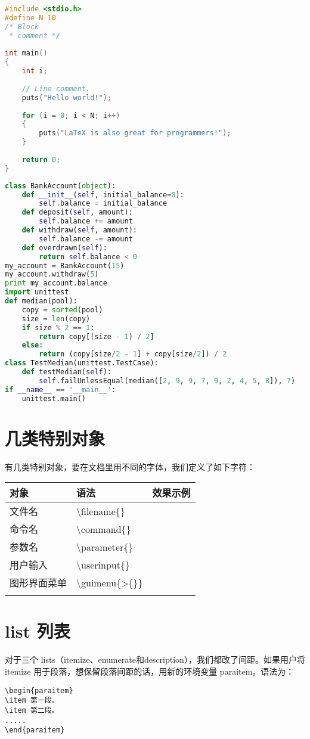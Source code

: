 \begin{lstlisting}[language=C,caption={C 代码示例},label=cLabel]
#include <stdio.h>
#define N 10
/* Block
 * comment */
 
int main()
{
    int i;
 
    // Line comment.
    puts("Hello world!");
 
    for (i = 0; i < N; i++)
    {
        puts("LaTeX is also great for programmers!");
    }
 
    return 0;
}
\end{lstlisting}

\begin{lstlisting}[language=python,caption={Python 代码示例},label=Python]
class BankAccount(object):
    def __init__(self, initial_balance=0):
        self.balance = initial_balance
    def deposit(self, amount):
        self.balance += amount
    def withdraw(self, amount):
        self.balance -= amount
    def overdrawn(self):
        return self.balance < 0
my_account = BankAccount(15)
my_account.withdraw(5)
print my_account.balance
import unittest
def median(pool):
    copy = sorted(pool)
    size = len(copy)
    if size % 2 == 1:
        return copy[(size - 1) / 2]
    else:
        return (copy[size/2 - 1] + copy[size/2]) / 2
class TestMedian(unittest.TestCase):
    def testMedian(self):
        self.failUnlessEqual(median([2, 9, 9, 7, 9, 2, 4, 5, 8]), 7)
if __name__ == '__main__':
    unittest.main()
\end{lstlisting}



\section{几类特别对象}
有几类特别对象，要在文档里用不同的字体，我们定义了如下字符：

\begin{tabu}{lll} \thickhline \rowfont{\bfseries}
对象 & 语法 & 效果示例 \\ \hline
文件名 & \textbackslash filename\{\} &  \\
命令名 & \textbackslash command\{\} &  \\
参数名 & \textbackslash parameter\{\} &  \\
用户输入 & \textbackslash userinput\{\} &  \\
图形界面菜单 & \textbackslash guimenu\{>\{\}\} &  \\
\thickhline \end{tabu}

\section{list 列表}
对于三个 lists（itemize、enumerate和description），我们都改了间距。如果用户将 itemize 用于段落，想保留段落间距的话，用新的环境变量 paraitem。语法为：
\begin{lstlisting}[language={[LaTeX]TeX},caption={保留段落间距的环境变量}]
\begin{paraitem}
\item 第一段。
\item 第二段。
.....
\end{paraitem}
\end{lstlisting}

